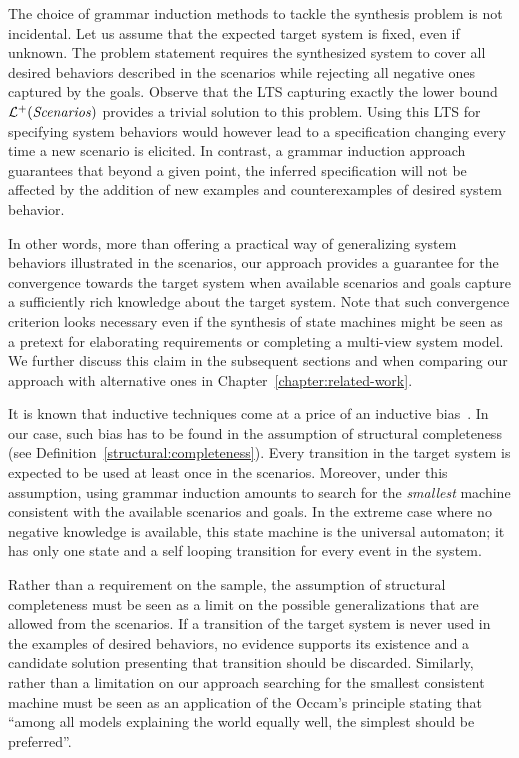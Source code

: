 The choice of grammar induction methods to tackle the synthesis problem is not incidental. Let us assume that the expected target system is fixed, even if unknown. The problem statement requires the synthesized system to cover all desired behaviors described in the scenarios while rejecting all negative ones captured by the goals. Observe that the LTS capturing exactly the lower bound $\mathcal{L}^+(\mbox{\emph{Scenarios}})$ provides a trivial solution to this problem. Using this LTS for specifying system behaviors would however lead to a specification changing every time a new scenario is elicited. In contrast, a grammar induction approach guarantees that beyond a given point, the inferred specification will not be affected by the addition of new examples and counterexamples of desired system behavior. 

In other words, more than offering a practical way of generalizing system behaviors illustrated in the scenarios, our approach provides a guarantee for the convergence towards the target system when available scenarios and goals capture a sufficiently rich knowledge about the target system. Note that such convergence criterion looks necessary even if the synthesis of state machines might be seen as a pretext for elaborating requirements or completing a multi-view system model. We further discuss this claim in the subsequent sections and when comparing our approach with alternative ones in Chapter~\ref{chapter:related-work}.

It is known that inductive techniques come at a price of an inductive bias~\cite{Mitchell:1980}. In our case, such bias has to be found in the assumption of structural completeness (see Definition~\ref{structural:completeness}). Every transition in the target system is expected to be used at least once in the scenarios. Moreover, under this assumption, using grammar induction amounts to search for the \emph{smallest} machine consistent with the available scenarios and goals. In the extreme case where no negative knowledge is available, this state machine is the universal automaton; it has only one state and a self looping transition for every event in the system.

Rather than a requirement on the sample, the assumption of structural completeness must be seen as a limit on the possible generalizations that are allowed from the scenarios. If a transition of the target system is never used in the examples of desired behaviors, no evidence supports its existence and a candidate solution presenting that transition should be discarded. Similarly, rather than a limitation on our approach searching for the smallest consistent machine must be seen as an application of the Occam's principle stating that ``among all models explaining the world equally well, the simplest should be preferred''.

